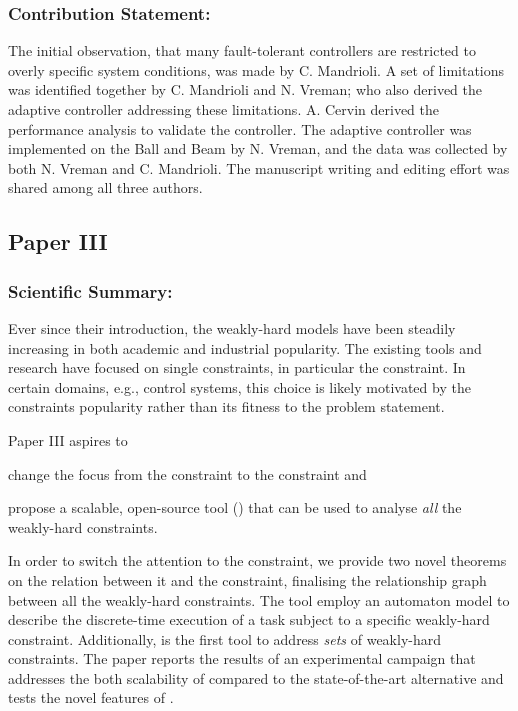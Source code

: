 \subsubsection*{Contribution Statement:}%
%
The initial observation, that many fault-tolerant controllers are restricted to overly specific system conditions, was made by C. Mandrioli.
A set of limitations was identified together by C. Mandrioli and N. Vreman; who also derived the adaptive controller addressing these limitations.
A. Cervin derived the performance analysis to validate the controller.
The adaptive controller was implemented on the Ball and Beam by N. Vreman, and the data was collected by both N. Vreman and C. Mandrioli.
The manuscript writing and editing effort was shared among all three authors.


\subsection*{Paper III}%
%
\begin{quote}
\end{quote}

\subsubsection*{Scientific Summary:}%
%
Ever since their introduction, the weakly-hard models have been steadily increasing in both academic and industrial popularity.
The existing tools and research have focused on single constraints, in particular the \tAM{} constraint.
In certain domains, e.g., control systems, this choice is likely motivated by the \tAM{} constraints popularity rather than its fitness to the problem statement.

Paper III aspires to
\begin{enumerate*}[label=(\roman*)]
    \item change the focus from the \tAM{} constraint to the \tRH{} constraint and
    \item propose a scalable, open-source tool (\tool{}) that can be used to analyse \emph{all} the weakly-hard constraints.
\end{enumerate*}
In order to switch the attention to the \tRH{} constraint, we provide two novel theorems on the relation between it and the \tAH{} constraint, finalising the relationship graph between all the weakly-hard constraints.
The \tool{} tool employ an automaton model to describe the discrete-time execution of a task subject to a specific weakly-hard constraint.
Additionally, \tool{} is the first tool to address \emph{sets} of weakly-hard constraints.
The paper reports the results of an experimental campaign that addresses the both scalability of \tool{} compared to the state-of-the-art alternative and tests the novel features of \tool{}.

